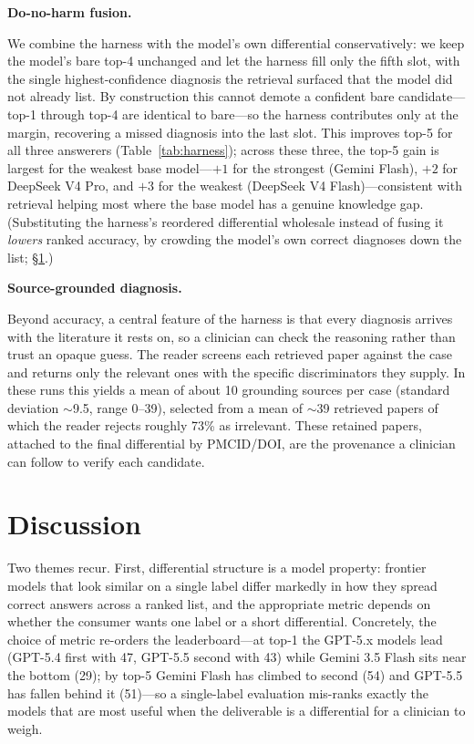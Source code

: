 \documentclass{article}
\renewcommand{\paragraph}[1]{%
  \par\addvspace{0.42\baselineskip}%
  \noindent\textbf{#1}\par\nobreak\vspace{-0.28\baselineskip}%
}
\begin{document}
\paragraph{Do-no-harm fusion.} We combine the harness with the model's own differential conservatively: we
keep the model's bare top-4 unchanged and let the harness fill only the fifth slot, with the single
highest-confidence diagnosis the retrieval surfaced that the model did not already list. By construction this
cannot demote a confident bare candidate---top-1 through top-4 are identical to bare---so the harness
contributes only at the margin, recovering a missed diagnosis into the last slot. This improves top-5
for all three answerers (Table~\ref{tab:harness}); across these three, the top-5 gain is largest for the
weakest base model---$+1$ for the strongest (Gemini Flash), $+2$ for DeepSeek V4 Pro, and $+3$ for the
weakest (DeepSeek V4 Flash)---consistent with retrieval helping most where the base model has a genuine
knowledge gap.
(Substituting the harness's reordered differential wholesale instead of fusing it \emph{lowers} ranked
accuracy, by crowding the model's own correct diagnoses down the list; \S\ref{sec:disc}.)

\paragraph{Source-grounded diagnosis.} Beyond accuracy, a central feature of the harness is that every
diagnosis arrives with the literature it rests on, so a clinician can check the reasoning rather than trust
an opaque guess. The reader screens each retrieved paper against the case and returns only the relevant
ones with the specific discriminators they supply. In these runs this yields a mean of about 10 grounding
sources per case (standard deviation $\sim$9.5, range 0--39), selected from a mean of $\sim$39 retrieved
papers of which the reader rejects roughly 73\% as irrelevant. These retained papers, attached to the final differential by PMCID/DOI,
are the provenance a clinician can follow to verify each candidate.

\section{Discussion}\label{sec:disc}

Two themes recur. First, differential structure is a model property: frontier models that look similar on a
single label differ markedly in how they spread correct answers across a ranked list, and the appropriate
metric depends on whether the consumer wants one label or a short differential. Concretely, the choice of
metric re-orders the leaderboard---at top-1 the GPT-5.x models lead (GPT-5.4 first with 47, GPT-5.5 second
with 43) while Gemini 3.5 Flash sits near the bottom (29); by top-5 Gemini Flash has climbed to second (54)
and GPT-5.5 has fallen behind it (51)---so a single-label evaluation mis-ranks exactly the models that are
most useful when the deliverable is a differential for a clinician to weigh.
\end{document}
